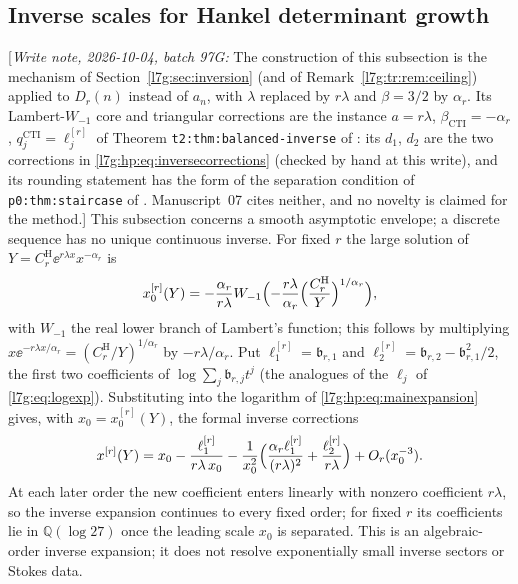 \documentclass[11pt,letterpaper]{article}
\theoremstyle{remark}\newtheorem{remark}[theorem]{Remark}
\newcommand{\Q}{\mathbb Q}\newcommand{\tht}{\vartheta}
\newcommand{\hpnote}[1]{\textup{[}\emph{Write note, 2026-10-04, batch 97G:} #1\textup{]}}
\newcounter{l7gtrsavedeq}
\begin{document}
\subsection{Inverse scales for Hankel determinant growth}\label{l7g:hp:sec:inverse}
\hpnote{The construction of this subsection is the mechanism of
Section~\ref{l7g:sec:inversion} (and of Remark~\ref{l7g:tr:rem:ceiling})
applied to $D_r(n)$ instead of $a_n$, with $\lambda$ replaced by $r\lambda$
and $\beta=3/2$ by $\alpha_r$. Its Lambert-$W_{-1}$ core and triangular
corrections are the instance $a=r\lambda$, $\beta_{\mathrm{CTI}}=-\alpha_r$,
$q_j^{\mathrm{CTI}}=\ell^{[r]}_j$ of Theorem
\texttt{t2:thm:balanced-inverse} of \cite{l7g:cti}: its $d_1$, $d_2$ are
the two corrections in \eqref{l7g:hp:eq:inversecorrections} (checked by
hand at this write), and its rounding statement has the form of the
separation condition of \texttt{p0:thm:staircase} of \cite{l7g:tai}.
Manuscript~07 cites neither, and no novelty is claimed for the method.}
This subsection concerns a smooth asymptotic envelope; a discrete sequence
has no unique continuous inverse. For fixed $r$ the large solution of
$Y=C^{\mathrm H}_r\ee^{r\lambda x}x^{-\alpha_r}$ is
\begin{equation}\label{l7g:hp:eq:Lambertinverse}
 x^{[r]}_0(Y)=-\frac{\alpha_r}{r\lambda}
 W_{-1}\Bigl(-\frac{r\lambda}{\alpha_r}\Bigl(\frac{C^{\mathrm H}_r}{Y}\Bigr)^{1/\alpha_r}\Bigr),
\end{equation}
with $W_{-1}$ the real lower branch of Lambert's function; this follows by
multiplying $x\ee^{-r\lambda x/\alpha_r}=(C^{\mathrm H}_r/Y)^{1/\alpha_r}$ by
$-r\lambda/\alpha_r$. Put $\ell^{[r]}_1=\mathfrak b_{r,1}$ and
$\ell^{[r]}_2=\mathfrak b_{r,2}-\mathfrak b_{r,1}^2/2$, the first two
coefficients of $\log\sum_j\mathfrak b_{r,j}t^j$ (the analogues of the
$\ell_j$ of \eqref{l7g:eq:logexp}). Substituting into the logarithm of
\eqref{l7g:hp:eq:mainexpansion} gives, with $x_0=x^{[r]}_0(Y)$, the formal
inverse corrections
\begin{equation}\label{l7g:hp:eq:inversecorrections}
 x^{[r]}(Y)=x_0-\frac{\ell^{[r]}_1}{r\lambda\,x_0}
 -\frac1{x_0^2}\Bigl(\frac{\alpha_r\ell^{[r]}_1}{(r\lambda)^2}+\frac{\ell^{[r]}_2}{r\lambda}\Bigr)
 +O_r(x_0^{-3}).
\end{equation}
At each later order the new coefficient enters linearly with nonzero
coefficient $r\lambda$, so the inverse expansion continues to every fixed
order; for fixed $r$ its coefficients lie in $\Q(\log27)$ once the leading
scale $x_0$ is separated. This is an algebraic-order inverse expansion; it
does not resolve exponentially small inverse sectors or Stokes data.
\end{document}
